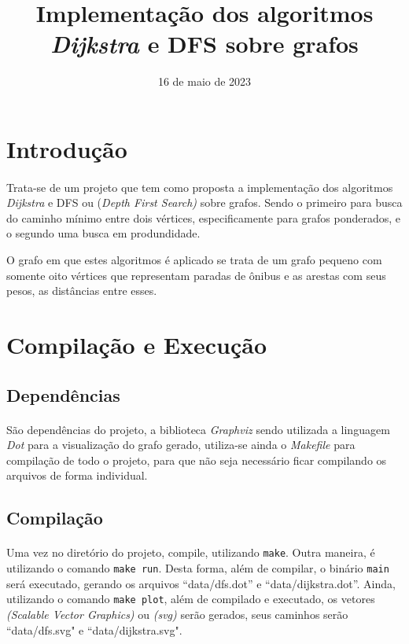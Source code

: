 \documentclass{article}
\title{Implementação dos algoritmos {\it Dijkstra\/} e DFS sobre grafos}
\author{\sc{Paulo Ricardo \& Vinícios Bidin}}
\date{16 de maio de 2023}
\begin{document}
    \maketitle
	\pagebreak
	\tableofcontents

    \section{Introdução}
        \paragraph{} Trata-se de um projeto que tem como proposta a implementação dos algoritmos {\it Dijkstra} e DFS ou {(\it Depth First Search)} sobre grafos. Sendo o primeiro para busca do caminho mínimo entre dois vértices, especificamente para grafos ponderados, e o segundo uma busca em produndidade.
		\par O grafo em que estes algoritmos é aplicado se trata de um grafo pequeno com somente oito vértices que representam paradas de ônibus e as arestas com seus pesos, as distâncias entre esses.

		\section{Compilação e Execução}
			\subsection{Dependências}
				\paragraph{} São dependências do projeto, a biblioteca {\it Graphviz} sendo utilizada a linguagem {\it Dot} para a visualização do grafo gerado, utiliza-se ainda o {\it Makefile} para compilação de todo o projeto, para que não seja necessário ficar compilando os arquivos de forma individual.

			\subsection{Compilação}
				\paragraph{} Uma vez no diretório do projeto, compile, utilizando \texttt{make}.
				Outra maneira, é utilizando o comando \texttt{make run}. Desta forma, além de compilar, o binário \texttt{main} será executado, gerando os arquivos ``data/dfs.dot'' e ``data/dijkstra.dot''.
				Ainda, utilizando o comando \texttt{make plot}, além de compilado e executado, os vetores {\it (Scalable Vector Graphics)} ou {\it (svg)} serão gerados, seus caminhos serão ``data/dfs.svg" e ``data/dijkstra.svg".
\end{document}
